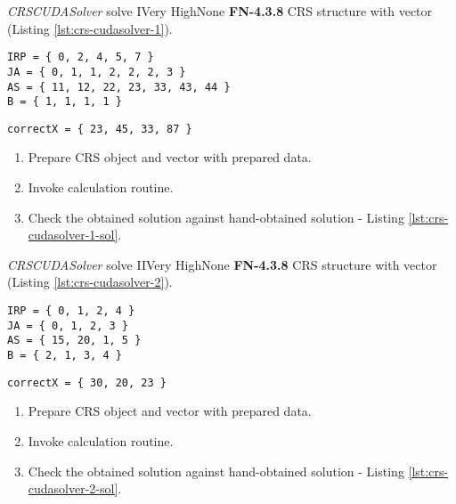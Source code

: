 \begin{testcase}{\emph{CRSCUDASolver} solve I}{Very High}{None}
		{
			\textbf{FN-4.3.8}
		}
		{
			\gls{CRS} structure with vector (Listing \ref{lst:crs-cudasolver-1}).	
		}
		\begin{lstlisting}[label={lst:crs-cudasolver-1},caption={\gls{CRS} format and vector data example}, frame=single]
IRP = { 0, 2, 4, 5, 7 }
JA = { 0, 1, 1, 2, 2, 2, 3 }
AS = { 11, 12, 22, 23, 33, 43, 44 }
B = { 1, 1, 1, 1 }
		\end{lstlisting}
		\begin{lstlisting}[label={lst:crs-cudasolver-1-sol},caption={\gls{CRS} format and vector data example}, frame=single]
correctX = { 23, 45, 33, 87 }
		\end{lstlisting}

		{	
			\begin{enumerate}
				\item Prepare \gls{CRS} object and vector with prepared data.
				\item Invoke calculation routine.
				\item
				{
					Check the obtained solution against hand-obtained solution - Listing \ref{lst:crs-cudasolver-1-sol}.
				}
			\end{enumerate}
		}
	\end{testcase}

\begin{testcase}{\emph{CRSCUDASolver} solve II}{Very High}{None}
	{
		\textbf{FN-4.3.8}
	}
	{
		\gls{CRS} structure with vector (Listing \ref{lst:crs-cudasolver-2}).	
	}
	\begin{lstlisting}[label={lst:crs-cudasolver-2},caption={\gls{CRS} format and vector data example}, frame=single]
IRP = { 0, 1, 2, 4 }
JA = { 0, 1, 2, 3 }
AS = { 15, 20, 1, 5 }
B = { 2, 1, 3, 4 }
	\end{lstlisting}
	\begin{lstlisting}[label={lst:crs-cudasolver-2-sol},caption={\gls{CRS} format and vector data example}, frame=single]
correctX = { 30, 20, 23 }
	\end{lstlisting}
	
	{	
		\begin{enumerate}
			\item Prepare \gls{CRS} object and vector with prepared data.
			\item Invoke calculation routine.
			\item
			{
				Check the obtained solution against hand-obtained solution - Listing \ref{lst:crs-cudasolver-2-sol}.
			}
		\end{enumerate}
	}
\end{testcase}